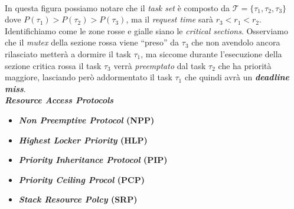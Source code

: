 \\
In questa figura possiamo notare che il \textit{task set} è composto da $\mathcal{T} = \{\tau_1, \tau_2, \tau_3\}$ dove $P(\tau_1) > P(\tau_2) > P(\tau_3)$, ma il \textit{request time} sarà $r_3 < r_1 < r_2$. Identifichiamo come le zone rosse e gialle siano le \textit{critical sections}. Osserviamo che il \textit{mutex} della sezione rossa viene ``preso'' da $\tau_3$ che non avendolo ancora rilasciato metterà a dormire il task $\tau_1$, ma siccome durante l'esecuzione della sezione critica rossa il task $\tau_3$ verrà \textit{preemptato} dal task $\tau_2$ che ha priorità maggiore, lasciando però addormentato il task $\tau_1$ che quindi avrà un \textbf{\textit{deadline miss}}. \\
\textbf{\textit{Resource Access Protocols}}
\begin{itemize}
    \item \textbf{\textit{Non Preemptive Protocol} (NPP)}
    \item \textbf{\textit{Highest Locker Priority} (HLP)}
    \item \textbf{\textit{Priority Inheritance Protocol} (PIP)}
    \item \textbf{\textit{Priority Ceiling Procol} (PCP)}
    \item \textbf{\textit{Stack Resource Polcy} (SRP)}
\end{itemize}
\newpage
